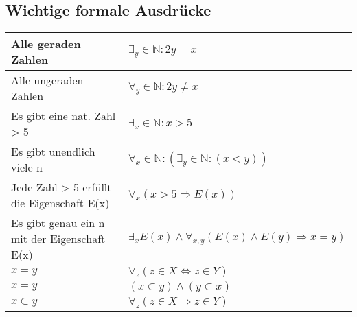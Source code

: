 \subsection{Wichtige formale Ausdrücke}
\begin{longtable}{p{}|p{}}
	Alle geraden Zahlen & \( \exists_y \in \mathbb{N}: 2y = x \)\\
	\hline
	Alle ungeraden Zahlen & \( \forall_y \in \mathbb{N}: 2y \neq x \)\\
	\hline
	Es gibt eine nat. Zahl > 5 & \(\exists_x \in \mathbb{N}: x > 5 \)\\
	\hline
	Es gibt unendlich viele n & \(\forall_x \in \mathbb{N}: (\exists_y \in \mathbb{N}: (x < y)) \)\\
	\hline
	Jede Zahl > 5 erfüllt die Eigenschaft E(x) & \(\forall_x (x > 5 \Rightarrow E(x)) \)\\
	\hline
	Es gibt genau ein n mit der Eigenschaft E(x) & \(\exists_x E(x) \wedge \forall_{x,y} (E(x) \wedge E(y) \Rightarrow x= y)\) \\
	\hline
	\(x = y\) & \(\forall_z(z \in X \Leftrightarrow z \in Y) \) \\
	\(x = y\) & \((x \subset y) \wedge (y \subset x)\) \\
	\hline
	\(x \subset y\) & \(\forall_z(z \in X \Rightarrow z \in Y) \) \\
\end{longtable}
